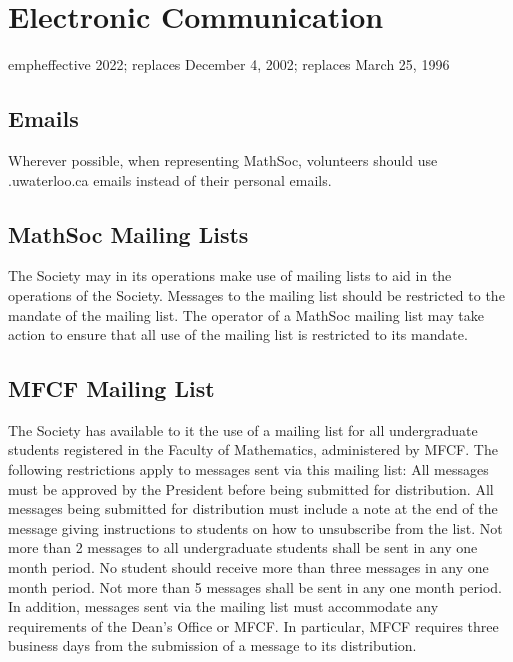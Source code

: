 \section{Electronic Communication}
emph{effective 2022; replaces December 4, 2002; replaces March 25, 1996}\\

\subsection{Emails}
Wherever possible, when representing MathSoc, volunteers should use \@mathsoc.uwaterloo.ca emails instead of their personal emails. 

\subsection{MathSoc Mailing Lists}
The Society may in its operations make use of mailing lists to aid in the operations of the Society. Messages to the mailing list should be restricted to the mandate of the mailing list. The operator of a MathSoc mailing list may take action to ensure that all use of the mailing list is restricted to its mandate.

\subsection{MFCF Mailing List}
The Society has available to it the use of a mailing list for all undergraduate students registered in the Faculty of Mathematics, administered by MFCF. The following restrictions apply to messages sent via this mailing list:
All messages must be approved by the President before being submitted for distribution.
All messages being submitted for distribution must include a note at the end of the message giving instructions to students on how to unsubscribe from the list.
Not more than 2 messages to all undergraduate students shall be sent in any one month period.
No student should receive more than three messages in any one month period.
Not more than 5 messages shall be sent in any one month period.
In addition, messages sent via the mailing list must accommodate any requirements of the Dean’s Office or MFCF. In particular, MFCF requires three business days from the submission of a message to its distribution.
